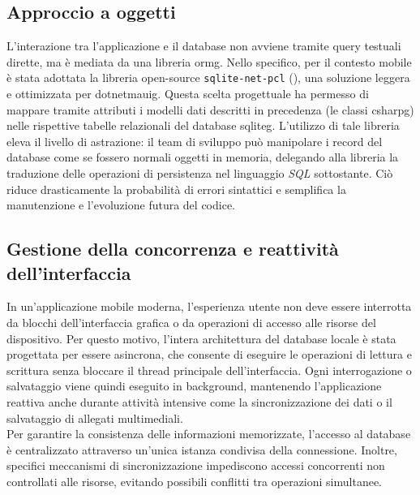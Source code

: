 \subsection*{Approccio a oggetti}
\noindent L'interazione tra l'applicazione e il database non avviene tramite query testuali dirette, ma è mediata da una libreria \gls{ormg}. Nello specifico, per il contesto mobile è stata adottata la libreria open-source \texttt{sqlite-net-pcl} (\cite{site:sqlite-net-pcl}), una soluzione leggera e ottimizzata per \gls{dotnetmauig}. Questa scelta progettuale ha permesso di mappare tramite attributi i modelli dati descritti in precedenza (le classi \gls{csharpg}) nelle rispettive tabelle relazionali del database \gls{sqliteg}. L'utilizzo di tale libreria eleva il livello di astrazione: il team di sviluppo può manipolare i record del database come se fossero normali oggetti in memoria, delegando alla libreria la traduzione delle operazioni di persistenza nel linguaggio \textit{SQL} sottostante. Ciò riduce drasticamente la probabilità di errori sintattici e semplifica la manutenzione e l'evoluzione futura del codice.

\subsection*{Gestione della concorrenza e reattività dell'interfaccia}
\noindent In un'applicazione mobile moderna, l'esperienza utente non deve essere interrotta da blocchi dell'interfaccia grafica o da operazioni di accesso alle risorse del dispositivo. Per questo motivo, l'intera architettura del database locale è stata progettata per essere asincrona, che consente di eseguire le operazioni di lettura e scrittura senza bloccare il thread principale dell'interfaccia. 
Ogni interrogazione o salvataggio viene quindi eseguito in background, mantenendo l'applicazione reattiva anche durante attività intensive come la sincronizzazione dei dati o il salvataggio di allegati multimediali. \\
Per garantire la consistenza delle informazioni memorizzate, l'accesso al database è centralizzato attraverso un'unica istanza condivisa della connessione. Inoltre, specifici meccanismi di sincronizzazione impediscono accessi concorrenti non controllati alle risorse, evitando possibili conflitti tra operazioni simultanee.


